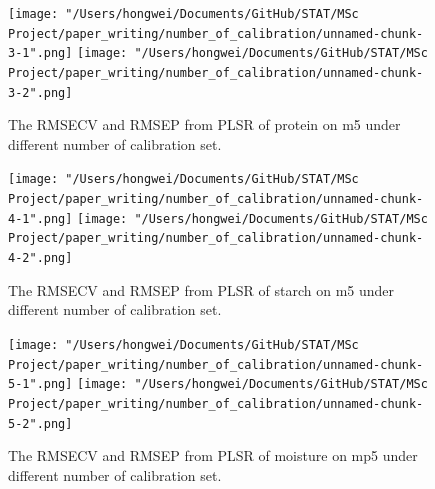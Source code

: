 \documentclass[a4paper,12pt,titlepage]{article} %
\numberwithin{equation}{section}  %
\begin{document}
\begin{appendices}
			\begin{figure}[h]    %
	\centering           %
	\texttt{[image: "/Users/hongwei/Documents/GitHub/STAT/MSc Project/paper\_writing/number\_of\_calibration/unnamed-chunk-3-1".png]}  %
	\texttt{[image: "/Users/hongwei/Documents/GitHub/STAT/MSc Project/paper\_writing/number\_of\_calibration/unnamed-chunk-3-2".png]}  %
	\caption{The RMSECV and RMSEP from PLSR of protein on m5 under different number of calibration set.}          %
	\label{fig:calibration_3-1}               %
\end{figure}                        %



			\begin{figure}[h]    %
	\centering           %
	\texttt{[image: "/Users/hongwei/Documents/GitHub/STAT/MSc Project/paper\_writing/number\_of\_calibration/unnamed-chunk-4-1".png]}  %
	\texttt{[image: "/Users/hongwei/Documents/GitHub/STAT/MSc Project/paper\_writing/number\_of\_calibration/unnamed-chunk-4-2".png]}  %
	\caption{The RMSECV and RMSEP from PLSR of starch on m5 under different number of calibration set.}          %
	\label{fig:calibration_4-1}               %
\end{figure}                        %



			\begin{figure}[h]    %
	\centering           %
	\texttt{[image: "/Users/hongwei/Documents/GitHub/STAT/MSc Project/paper\_writing/number\_of\_calibration/unnamed-chunk-5-1".png]}  %
	\texttt{[image: "/Users/hongwei/Documents/GitHub/STAT/MSc Project/paper\_writing/number\_of\_calibration/unnamed-chunk-5-2".png]}  %
	\caption{The RMSECV and RMSEP from PLSR of moisture on mp5 under different number of calibration set.}          %
	\label{fig:calibration_5-1}               %
\end{figure}                        %




\end{appendices}
\end{document}
